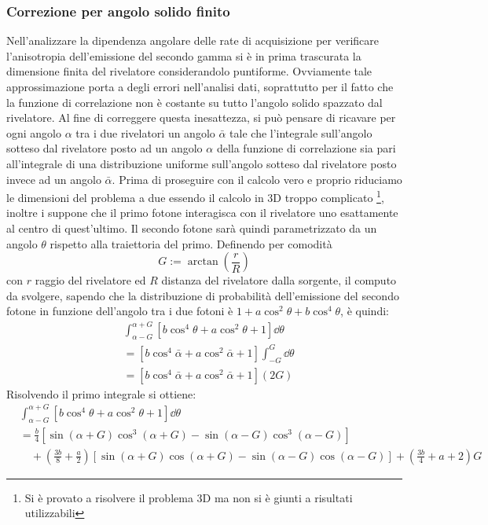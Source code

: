 \subsubsection{Correzione per angolo solido finito}

Nell'analizzare la dipendenza angolare delle rate di acquisizione per verificare l'anisotropia dell'emissione del secondo gamma si è in prima trascurata la dimensione finita del rivelatore 
considerandolo puntiforme. Ovviamente tale approssimazione porta a degli errori nell'analisi dati, soprattutto per il fatto che la funzione di correlazione non è costante su tutto l'angolo solido
spazzato dal rivelatore. Al fine di correggere questa inesattezza, si può pensare di ricavare per ogni angolo $\alpha$ tra i due rivelatori un angolo $\bar\alpha$ tale che l'integrale sull'angolo
sotteso dal rivelatore posto ad un angolo $\alpha$ della funzione di correlazione sia pari all'integrale di una distribuzione uniforme sull'angolo sotteso dal rivelatore posto invece ad un angolo 
$\bar\alpha$. Prima di proseguire con il calcolo vero e proprio riduciamo le dimensioni del problema a due essendo il calcolo in 3D troppo complicato \footnote{
Si è provato a risolvere il problema 3D ma non si è giunti a risultati utilizzabili}, inoltre i suppone che
il primo fotone interagisca con il rivelatore uno esattamente al centro di quest'ultimo. Il secondo fotone sarà quindi parametrizzato da un angolo $\theta$ rispetto alla traiettoria
del primo. Definendo per comodità 
\begin{equation}
	G := \arctan{\left(\frac{r}{R}\right)}
\end{equation}
con $ r $ raggio del rivelatore ed $ R $ distanza del rivelatore dalla sorgente, il computo da svolgere,
sapendo che la distribuzione di probabilità dell'emissione del secondo fotone in funzione dell'angolo tra i due fotoni è $1 + a \cos ^ 2 \theta + b \cos^4 \theta$, è quindi:
\begin{equation}
\begin{split}
	& \int_{\alpha -G}^{\alpha +G} \left[ b \cos^4 \theta + a \cos ^ 2  \theta + 1 \right] \dd \theta \\
	& = \left[ b \cos^4 \bar\alpha + a \cos ^ 2 \bar\alpha + 1 \right] \int_{-G}^{G} \dd\theta \\
	& = \left[ b \cos^4 \bar\alpha + a \cos ^ 2 \bar \alpha + 1 \right] \left( 2G \right)
\end{split}
\end{equation}
Risolvendo il primo integrale si ottiene:
\begin{equation}
\begin{split}
	& \int_{\alpha -G}^{\alpha + G} \left[ b \cos^4 \theta + a \cos ^ 2  \theta + 1 \right] \dd \theta \\
	& = \frac{b}{4}\left[ \sin \left( \alpha + G \right) \cos^3 \left( \alpha + G \right) - \sin \left( \alpha - G \right) \cos^3 \left( \alpha - G \right) \right] \\
	& \quad + \left( \frac{3b}{8} + \frac{a}{2} \right)\left[ \sin \left( \alpha + G \right) \cos \left( \alpha + G \right) - \sin \left( \alpha - G \right) \cos \left( \alpha - G \right) \right] + \left( \frac{3b}{4} + a + 2 \right)G
\end{split}
\end{equation}
